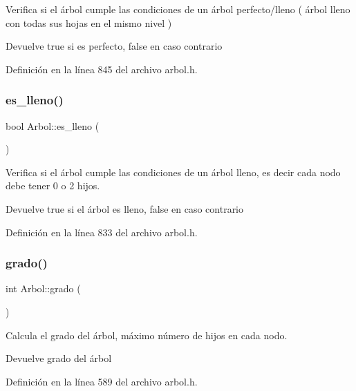 Verifica si el árbol cumple las condiciones de un árbol perfecto/lleno ( árbol lleno con todas sus hojas en el mismo nivel ) 

\begin{DoxyReturn}{Devuelve}
true si es perfecto, false en caso contrario 
\end{DoxyReturn}


Definición en la línea 845 del archivo arbol.\+h.

\mbox{\label{classArbol_a14ccdbb79a82bf19a24449acaea6c413}} 
\subsubsection{\texorpdfstring{es\+\_\+lleno()}{es\_lleno()}}
{\footnotesize\ttfamily bool Arbol\+::es\+\_\+lleno (\begin{DoxyParamCaption}{ }\end{DoxyParamCaption})}



Verifica si el árbol cumple las condiciones de un árbol lleno, es decir cada nodo debe tener 0 o 2 hijos. 

\begin{DoxyReturn}{Devuelve}
true si el árbol es lleno, false en caso contrario 
\end{DoxyReturn}


Definición en la línea 833 del archivo arbol.\+h.

\mbox{\label{classArbol_a99e608849650b891c34852a81f93d4ab}} 
\subsubsection{\texorpdfstring{grado()}{grado()}}
{\footnotesize\ttfamily int Arbol\+::grado (\begin{DoxyParamCaption}{ }\end{DoxyParamCaption})}



Calcula el grado del árbol, máximo número de hijos en cada nodo. 

\begin{DoxyReturn}{Devuelve}
grado del árbol 
\end{DoxyReturn}


Definición en la línea 589 del archivo arbol.\+h.

